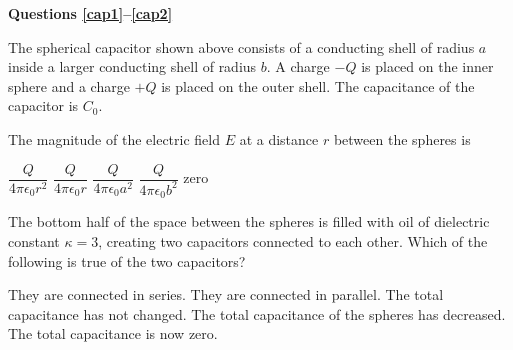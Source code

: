 \documentclass{../../oss-classkick-exam}
\begin{document}
\genheader


\genmultidirections
\raggedcolumns

\begin{multicols*}{2}
  \textbf{Questions \ref{cap1}--\ref{cap2}}

  \begin{center}
  \end{center}
  The spherical capacitor shown above consists of a conducting shell of
  radius $a$ inside a larger conducting shell of radius $b$. A charge $-Q$
  is placed on the inner sphere and a charge $+Q$ is placed on the outer
  shell. The capacitance of the capacitor is $C_0$.

  \begin{questions}
    \question The magnitude of the electric field $E$ at a distance $r$ between
    the spheres is
    \label{cap1}
    \begin{choices}
      \choice $\dfrac Q{4\pi\epsilon_0r^2}$
      \choice $\dfrac Q{4\pi\epsilon_0r}$
      \choice $\dfrac Q{4\pi\epsilon_0a^2}$
      \choice $\dfrac Q{4\pi\epsilon_0b^2}$
      \choice zero
    \end{choices}

    \question The bottom half of the space between the spheres is filled with
    oil of dielectric constant $\kappa=3$, creating two capacitors connected to
    each other. Which of the following is true of the two capacitors?
    \begin{center}
    \end{center}
    \begin{choices}
      \choice They are connected in series.
      \choice They are connected in parallel.
      \choice The total capacitance has not changed.
      \choice The total capacitance of the spheres has decreased.
      \choice The total capacitance is now zero.
    \end{choices}
    \vspace{.7in}
    

\end{questions}
\end{multicols*}
\end{document}
